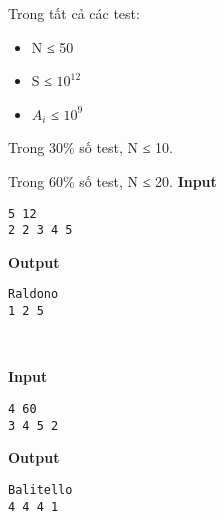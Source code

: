 Trong tất cả các test:
\begin{itemize}
	\item N ≤ 50
	\item S ≤ $10^{12}$
	\item $A_{i}$ ≤ $10^{9}$
\end{itemize}

Trong 30\% số test, N ≤ 10.

Trong 60\% số test, N ≤ 20.
\textbf{Input }
\begin{verbatim}
5 12
2 2 3 4 5\end{verbatim}

\textbf{Output }
\begin{verbatim}
Raldono
1 2 5\end{verbatim}

 

\textbf{Input }
\begin{verbatim}
4 60
3 4 5 2\end{verbatim}

\textbf{Output }
\begin{verbatim}
Balitello
4 4 4 1\end{verbatim}
